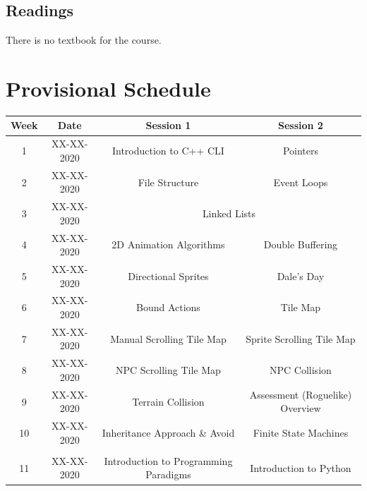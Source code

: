 \documentclass{article}
\begin{document}
\subsection*{Readings}
There is no textbook for the course.

\section*{Provisional Schedule}

\renewcommand{\arraystretch}{1.5}
\begin{tabular}{|c|c|c|c|}
  \hline
  \textbf{Week} & \textbf{Date} & \textbf{Session 1}                    & \textbf{Session 2}                         \\ \hline
  1             & XX-XX-2020    & Introduction to C++ CLI               & Pointers                                   \\ \hline
  2             & XX-XX-2020    & File Structure                        & Event Loops                                \\ \hline
  3             & XX-XX-2020    & \multicolumn{2}{c|}{Linked Lists}                                           \\ \hline
  4             & XX-XX-2020    & 2D Animation Algorithms               & Double Buffering                           \\ \hline
  5             & XX-XX-2020    & Directional Sprites                   & \cellcolor{yellow} Dale's Day              \\ \hline
  6             & XX-XX-2020    & Bound Actions                         & Tile Map                                   \\ \hline
  7             & XX-XX-2020    & Manual Scrolling Tile Map             & Sprite Scrolling Tile Map                  \\ \hline
  8             & XX-XX-2020    & NPC Scrolling Tile Map                & NPC Collision                              \\ \hline
  9             & XX-XX-2020    & Terrain Collision                     & Assessment (Roguelike) Overview            \\ \hline
  10            & XX-XX-2020    & Inheritance Approach \& Avoid         & Finite State Machines                      \\ \hline
  \rowcolor{yellow} \multicolumn{4}{|c|}{Mid Term Break}                                                      \\ \hline
  11            & XX-XX-2020    & Introduction to Programming Paradigms & Introduction to Python                     \\ \hline

\end{tabular}
\end{document}
